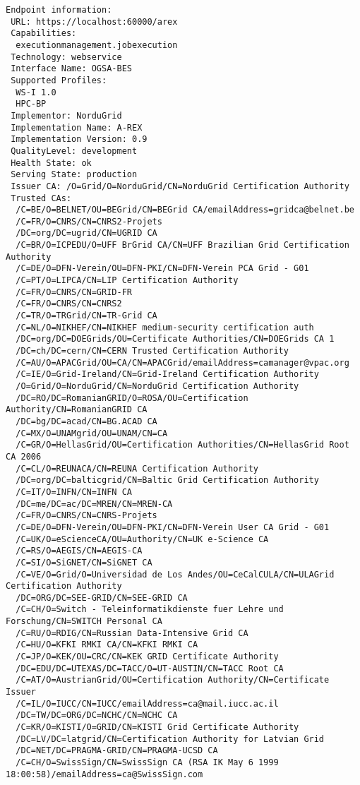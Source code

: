 \documentclass{article}                            %
\begin{document}
\begin{lstlisting}[caption={Example of proper arcinfo output},label=lst:arcinfo]
Endpoint information:
 URL: https://localhost:60000/arex
 Capabilities:
  executionmanagement.jobexecution
 Technology: webservice
 Interface Name: OGSA-BES
 Supported Profiles:
  WS-I 1.0
  HPC-BP
 Implementor: NorduGrid
 Implementation Name: A-REX
 Implementation Version: 0.9
 QualityLevel: development
 Health State: ok
 Serving State: production
 Issuer CA: /O=Grid/O=NorduGrid/CN=NorduGrid Certification Authority
 Trusted CAs:
  /C=BE/O=BELNET/OU=BEGrid/CN=BEGrid CA/emailAddress=gridca@belnet.be
  /C=FR/O=CNRS/CN=CNRS2-Projets
  /DC=org/DC=ugrid/CN=UGRID CA
  /C=BR/O=ICPEDU/O=UFF BrGrid CA/CN=UFF Brazilian Grid Certification Authority
  /C=DE/O=DFN-Verein/OU=DFN-PKI/CN=DFN-Verein PCA Grid - G01
  /C=PT/O=LIPCA/CN=LIP Certification Authority
  /C=FR/O=CNRS/CN=GRID-FR
  /C=FR/O=CNRS/CN=CNRS2
  /C=TR/O=TRGrid/CN=TR-Grid CA
  /C=NL/O=NIKHEF/CN=NIKHEF medium-security certification auth
  /DC=org/DC=DOEGrids/OU=Certificate Authorities/CN=DOEGrids CA 1
  /DC=ch/DC=cern/CN=CERN Trusted Certification Authority
  /C=AU/O=APACGrid/OU=CA/CN=APACGrid/emailAddress=camanager@vpac.org
  /C=IE/O=Grid-Ireland/CN=Grid-Ireland Certification Authority
  /O=Grid/O=NorduGrid/CN=NorduGrid Certification Authority
  /DC=RO/DC=RomanianGRID/O=ROSA/OU=Certification Authority/CN=RomanianGRID CA
  /DC=bg/DC=acad/CN=BG.ACAD CA
  /C=MX/O=UNAMgrid/OU=UNAM/CN=CA
  /C=GR/O=HellasGrid/OU=Certification Authorities/CN=HellasGrid Root CA 2006
  /C=CL/O=REUNACA/CN=REUNA Certification Authority
  /DC=org/DC=balticgrid/CN=Baltic Grid Certification Authority
  /C=IT/O=INFN/CN=INFN CA
  /DC=me/DC=ac/DC=MREN/CN=MREN-CA
  /C=FR/O=CNRS/CN=CNRS-Projets
  /C=DE/O=DFN-Verein/OU=DFN-PKI/CN=DFN-Verein User CA Grid - G01
  /C=UK/O=eScienceCA/OU=Authority/CN=UK e-Science CA
  /C=RS/O=AEGIS/CN=AEGIS-CA
  /C=SI/O=SiGNET/CN=SiGNET CA
  /C=VE/O=Grid/O=Universidad de Los Andes/OU=CeCalCULA/CN=ULAGrid Certification Authority
  /DC=ORG/DC=SEE-GRID/CN=SEE-GRID CA
  /C=CH/O=Switch - Teleinformatikdienste fuer Lehre und Forschung/CN=SWITCH Personal CA
  /C=RU/O=RDIG/CN=Russian Data-Intensive Grid CA
  /C=HU/O=KFKI RMKI CA/CN=KFKI RMKI CA
  /C=JP/O=KEK/OU=CRC/CN=KEK GRID Certificate Authority
  /DC=EDU/DC=UTEXAS/DC=TACC/O=UT-AUSTIN/CN=TACC Root CA
  /C=AT/O=AustrianGrid/OU=Certification Authority/CN=Certificate Issuer
  /C=IL/O=IUCC/CN=IUCC/emailAddress=ca@mail.iucc.ac.il
  /DC=TW/DC=ORG/DC=NCHC/CN=NCHC CA
  /C=KR/O=KISTI/O=GRID/CN=KISTI Grid Certificate Authority
  /DC=LV/DC=latgrid/CN=Certification Authority for Latvian Grid
  /DC=NET/DC=PRAGMA-GRID/CN=PRAGMA-UCSD CA
  /C=CH/O=SwissSign/CN=SwissSign CA (RSA IK May 6 1999 18:00:58)/emailAddress=ca@SwissSign.com

\end{lstlisting}
\end{document}
